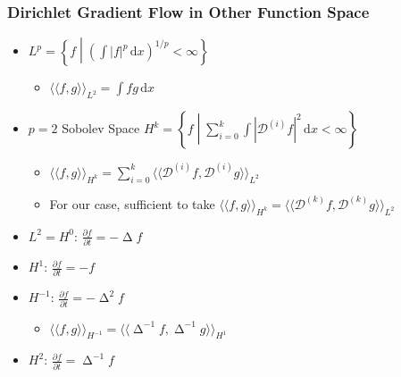 \documentclass{beamer}
\theoremstyle{remark}
\newcommand{\intd}{\, \text{d}}
\newcommand{\inner}[1]{\langle \langle #1 \rangle \rangle}
\DeclareMathOperator{\laplace}{\Delta}
\begin{document}
\begin{frame}
    \frametitle{Dirichlet Gradient Flow in Other Function Space}
    \begin{definition}
        \begin{itemize}
            \item $L^p = \left\{ f \middle| \left( \int |f|^p \intd x \right)^{1/p} < \infty \right\}$
                \begin{itemize}
                    \item $\inner{f, g}_{L^2} = \int f g \intd x$
                \end{itemize}
            \item $p=2$ Sobolev Space $H^{k} = \left\{ f \middle| \sum_{i=0}^{k} \int \left| \mathcal{D}^{(i)} f \right|^2 \intd x < \infty \right\}$
                \begin{itemize}
                    \item $\inner{f, g}_{H^k} = \sum_{i=0}^k \inner{\mathcal{D}^{(i)} f, \mathcal{D}^{(i)} g}_{L^2}$
                    \item For our case, sufficient to take $\inner{f, g}_{H^k} = \inner{\mathcal{D}^{(k)} f, \mathcal{D}^{(k)} g}_{L^2}$
                \end{itemize}
        \end{itemize}
    \end{definition}

    {
        \begin{itemize}
            \item $L^2 = H^0$: $\frac{\partial f}{\partial t} = - \laplace f$
            \item $H^1$: $\frac{\partial f}{\partial t} = -f$
            \item $H^{-1}$: $\frac{\partial f}{\partial t} = - \laplace^2 f$
                \begin{itemize}
                    \item $\inner{f, g}_{H^{-1}} = \inner{\laplace^{-1} f, \laplace^{-1} g}_{H^1}$
                \end{itemize}
            \item $H^2$: $\frac{\partial f}{\partial t} = \laplace^{-1} f$
        \end{itemize}
    }
\end{frame}
\end{document}
